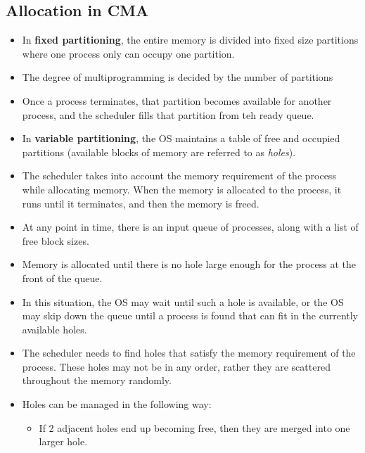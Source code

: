 \documentclass{article}
\theoremstyle{plain}
\theoremstyle{definition}
\begin{document}
\subsection{Allocation in CMA}
\begin{itemize}
    \item In \textbf{fixed partitioning}, the entire memory is divided into fixed size partitions where one process only can occupy one partition.
    
    \item The degree of multiprogramming is decided by the number of partitions
    
    \item Once a process terminates, that partition becomes available for another process, and the scheduler fills that partition from teh ready queue.
    
    \item In \textbf{variable partitioning}, the OS maintains a table of free and occupied partitions (available blocks of memory are referred to as \textit{holes}).
    
    \item The scheduler takes into account the memory requirement of the process while allocating memory. When the memory is allocated to the process, it runs until it terminates, and then the memory is freed.
    
    \item At any point in time, there is an input queue of processes, along with a list of free block sizes. 
    
    \item Memory is allocated until there is no hole large enough for the process at the front of the queue. 
    
    \item In this situation, the OS may wait until such a hole is available, or the OS may skip down the queue until a process is found that can fit in the currently available holes. 
    
    \item The scheduler needs to find holes that satisfy the memory requirement of the process. These holes may not be in any order, rather they are scattered throughout the memory randomly. 
    
    \item Holes can be managed in the following way: 
    
    \begin{itemize}
        \item If 2 adjacent holes end up becoming free, then they are merged into one larger hole.
        

\end{itemize}
\end{itemize}
\end{document}

